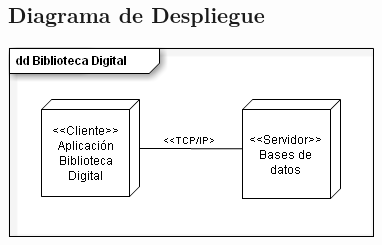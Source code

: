\subsection{Diagrama de Despliegue}
\begin{minipage}{1\textwidth}
	\centering
	\includegraphics[scale=0.8]{diagramaDespliegue}
\end{minipage}\\[1cm]

%